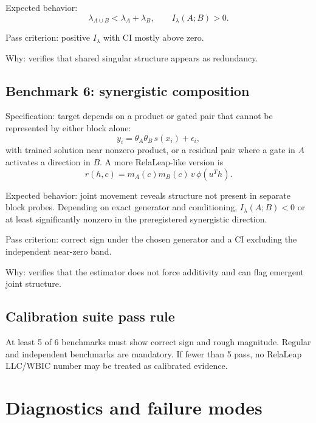 \documentclass[11pt]{article}
\begin{document}
Expected behavior:
\begin{equation}
  \lambda_{A\cup B} < \lambda_A + \lambda_B,
  \qquad I_\lambda(A;B)>0.
\end{equation}

Pass criterion: positive $I_\lambda$ with CI mostly above zero.

Why: verifies that shared singular structure appears as redundancy.

\subsection{Benchmark 6: synergistic composition}

Specification: target depends on a product or gated pair that cannot be represented by either block alone:
\begin{equation}
  y_i = \theta_A\theta_B\,s(x_i) + \epsilon_i,
\end{equation}
with trained solution near nonzero product, or a residual pair where a gate in $A$ activates a direction in $B$.  A more RelaLeap-like version is
\begin{equation}
  r(h,c)=m_A(c)m_B(c)\,v\,\phi(u^T h).
\end{equation}

Expected behavior: joint movement reveals structure not present in separate block probes.  Depending on exact generator and conditioning, $I_\lambda(A;B)<0$ or at least significantly nonzero in the preregistered synergistic direction.

Pass criterion: correct sign under the chosen generator and a CI excluding the independent near-zero band.

Why: verifies that the estimator does not force additivity and can flag emergent joint structure.

\subsection{Calibration suite pass rule}

At least 5 of 6 benchmarks must show correct sign and rough magnitude.  Regular and independent benchmarks are mandatory.  If fewer than 5 pass, no RelaLeap LLC/WBIC number may be treated as calibrated evidence.

\section{Diagnostics and failure modes}
\end{document}
